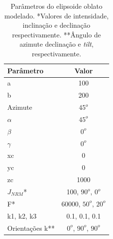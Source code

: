 \begin{table}[h]
	\begin{center}
		\begin{tabular}{|l|c|}
			\hline
			\textbf{Parâmetro}  & \textbf{Valor}  \\
			\hline 
			a   & 100 \\
			\hline
			b   & 200  \\
			\hline
			Azimute   & $45^o$ \\
			\hline
			$\alpha$    & $45^o$   \\
			\hline
			$\beta$    & $0^o$ \\
			\hline
			$\gamma$   & $0^o$  \\
			\hline
			xc   & 0  \\
			\hline          
			yc   & 0  \\
			\hline                
			zc   & 1000  \\
			\hline
			$J_{NRM}$*  & 100, $90^o$, $0^o$  \\
			\hline
			F*    & 60000, $50^o$, $20^o$ \\
			\hline
			k1, k2, k3   & 0.1, 0.1, 0.1  \\
			\hline
			Orientações k**   & $0^o$, $90^o$, $90^o$  \\
			\hline
		\end{tabular}
		\caption{Parâmetros do elipsoide oblato modelado. *Valores de intensidade, inclinação e declinação respectivamente. **Ângulo de azimute
			declinação e \textit{tilt}, respectivamente.}
	\end{center}
	\label{tab:oblate}
\end{table}

